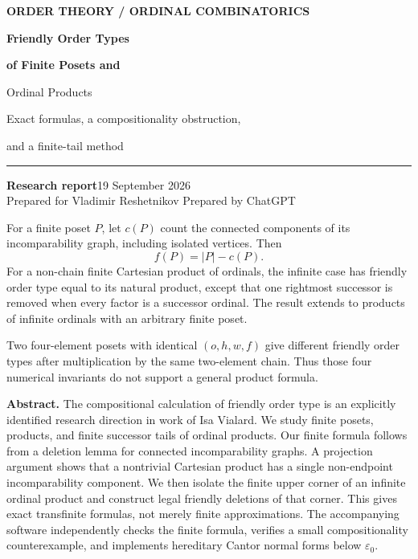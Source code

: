 \documentclass[11pt,letterpaper]{article}
\theoremstyle{definition}
\theoremstyle{remark}
\newcommand{\fot}{f}
\begin{document}
\begin{titlepage}
\color{ink}
\vspace*{.03in}
{\small\bfseries\color{olive}\MakeUppercase{Order theory \enspace / \enspace Ordinal combinatorics}}
\par\vspace{.2in}
{\fontsize{29}{33}\selectfont\bfseries\color{forest}Friendly Order Types\par}
\vspace{.08in}
{\fontsize{27}{31}\selectfont\bfseries\color{forest}of Finite Posets and\par Ordinal Products\par}
\vspace{.18in}
{\large Exact formulas, a compositionality obstruction,\par and a finite-tail method\par}
\vspace{.18in}
\noindent\textcolor{olive}{\rule{\textwidth}{1pt}}
\vspace{.16in}
\noindent\textbf{Research report}\hfill 19 September 2026\\[.35em]
Prepared for Vladimir Reshetnikov \hfill Prepared by ChatGPT
\vspace{.14in}
\begin{resultbox}[title={\bfseries Main conclusions}]
\small
For a finite poset $P$, let $c(P)$ count the connected components of its
incomparability graph, including isolated vertices. Then
\[
 \fot(P)=|P|-c(P).
\]
For a non-chain finite Cartesian product of ordinals, the infinite case has
friendly order type equal to its natural product, except that one rightmost
successor is removed when every factor is a successor ordinal. The result
extends to products of infinite ordinals with an arbitrary finite poset.

Two four-element posets with identical $(o,h,w,f)$ give different friendly
order types after multiplication by the same two-element chain. Thus those
four numerical invariants do not support a general product formula.
\end{resultbox}
\vspace{.14in}
\small
\noindent\textbf{Abstract.}
The compositional calculation of friendly order type is an explicitly
identified research direction in work of Isa Vialard. We study finite
posets, products, and finite successor tails of ordinal products. Our
finite formula follows from a deletion lemma for connected incomparability
graphs. A projection argument shows that a nontrivial Cartesian product
has a single non-endpoint incomparability component. We then isolate the
finite upper corner of an infinite ordinal product and construct legal
friendly deletions of that corner. This gives exact transfinite formulas,
not merely finite approximations. The accompanying software independently
checks the finite formula, verifies a small compositionality counterexample,
and implements hereditary Cantor normal forms below $\varepsilon_0$.


\end{titlepage}
\end{document}
